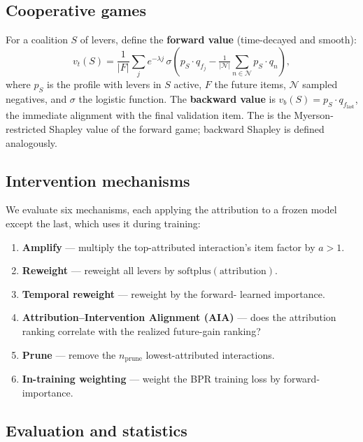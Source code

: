 \documentclass[pdflatex,sn-mathphys-num]{sn-jnl}%
\theoremstyle{thmstyleone}%
\theoremstyle{thmstyletwo}%
\theoremstyle{thmstylethree}%
\newcommand{\CAV}{\mathrm{CAV}}
\begin{document}
\subsection{Cooperative games}

For a coalition $S$ of levers, define the \textbf{forward value} (time-decayed and smooth):
\begin{equation}\label{eq:forward}
v_t(S) = \frac{1}{|F|} \sum_{j} e^{-\lambda j}\, \sigma\!\left( p_S \cdot q_{f_j} - \tfrac{1}{|\mathcal{N}|}\sum_{n\in\mathcal{N}} p_S \cdot q_{n} \right),
\end{equation}
where $p_S$ is the profile with levers in $S$ active, $F$ the future items, $\mathcal{N}$ sampled negatives, and $\sigma$ the logistic function. The \textbf{backward value} is $v_b(S) = p_S \cdot q_{f_{\mathrm{last}}}$, the immediate alignment with the final validation item. The \CAV{} is the Myerson-restricted Shapley value of the forward game; backward Shapley is defined analogously.

\subsection{Intervention mechanisms}

We evaluate six mechanisms, each applying the attribution to a frozen model except the last, which uses it during training:
\begin{enumerate}
\item \textbf{Amplify} --- multiply the top-attributed interaction's item factor by $a>1$.
\item \textbf{Reweight} --- reweight all levers by $\mathrm{softplus}(\text{attribution})$.
\item \textbf{Temporal reweight} --- reweight by the forward-\CAV{} learned importance.
\item \textbf{Attribution--Intervention Alignment (AIA)} --- does the attribution ranking correlate with the realized future-gain ranking?
\item \textbf{Prune} --- remove the $n_{\mathrm{prune}}$ lowest-attributed interactions.
\item \textbf{In-training weighting} --- weight the BPR training loss by forward-\CAV{} importance.
\end{enumerate}

\subsection{Evaluation and statistics}
\end{document}
